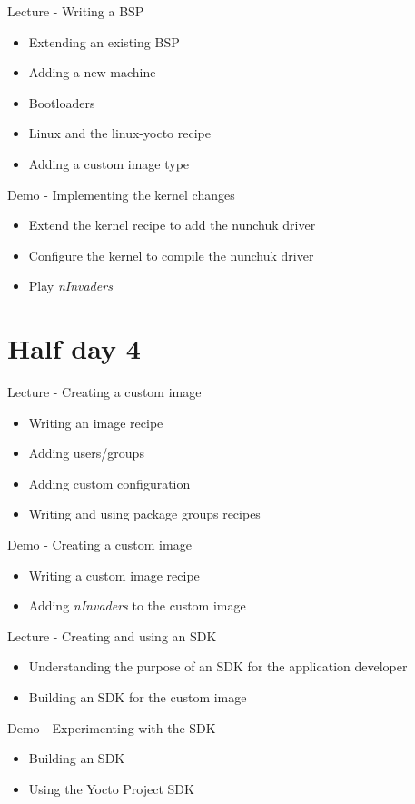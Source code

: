 \documentclass[a4paper,12pt,obeyspaces,spaces,hyphens]{article}
\begin{document}
\feagendatwocolumn
{Lecture - Writing a BSP}
{
  \begin{itemize}
  \item Extending an existing BSP
  \item Adding a new machine
  \item Bootloaders
  \item Linux and the linux-yocto recipe
  \item Adding a custom image type
  \end{itemize}
}
{Demo - Implementing the kernel changes}
{
  \begin{itemize}
  \item Extend the kernel recipe to add the nunchuk driver
  \item Configure the kernel to compile the nunchuk driver
  \item Play {\em nInvaders}
  \end{itemize}
}

\section{Half day 4}

\feagendatwocolumn
{Lecture - Creating a custom image}
{
  \begin{itemize}
  \item Writing an image recipe
  \item Adding users/groups
  \item Adding custom configuration
  \item Writing and using package groups recipes
  \end{itemize}
}
{Demo - Creating a custom image}
{
  \begin{itemize}
  \item Writing a custom image recipe
  \item Adding {\em nInvaders} to the custom image
  \end{itemize}
}
\feagendatwocolumn
{Lecture - Creating and using an SDK}
{
  \begin{itemize}
  \item Understanding the purpose of an SDK for the application
    developer
  \item Building an SDK for the custom image
  \end{itemize}
}
{Demo - Experimenting with the SDK}
{
  \begin{itemize}
  \item Building an SDK
  \item Using the Yocto Project SDK
  \end{itemize}
}
\end{document}
